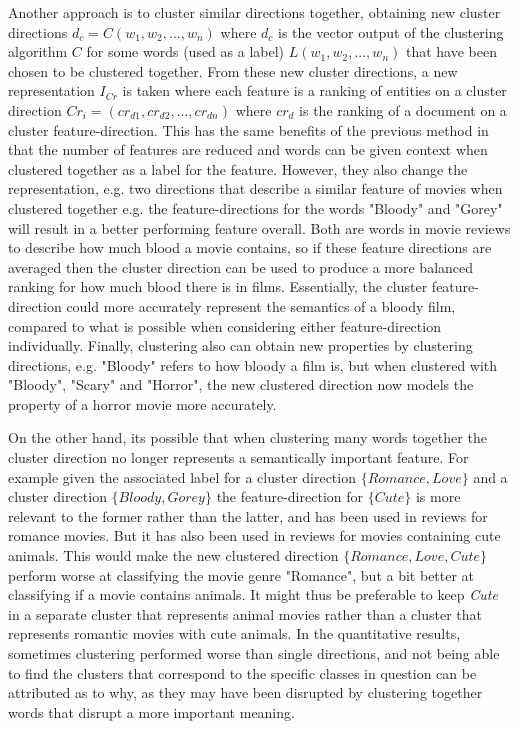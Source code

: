Another approach is to cluster similar directions together, obtaining new cluster directions ${d_c} = C(w_1, w_2, ..., w_n)$  where  $d_c$ is the vector output of the clustering algorithm $C$ for some words (used as a label) $L(w_1, w_2, ..., w_n)$  that have been chosen to be clustered together. From these new cluster directions,  a new representation $I_{Cr}$ is taken where each feature is a  ranking of entities on a cluster direction  ${Cr_i} = ({cr}_{d1}, {cr}_{d2}, ..., {cr}_{dn})$ where ${cr}_d$ is the ranking of a document on a cluster feature-direction.  %
This has the same  benefits of the previous method in that the number of features are reduced and words can be given context when clustered together as a label for the feature. However, they also change the representation, e.g. two directions that describe a similar feature of movies when clustered together  e.g. the feature-directions for the words "Bloody" and "Gorey" will result in a better performing feature overall. Both are words in movie reviews to describe how much blood a movie contains, so if these feature directions are averaged then the cluster direction can be used to produce a more balanced ranking for how much blood there is in films.  Essentially, the cluster feature-direction could more accurately represent the semantics of a bloody  film, compared to what is possible when considering either feature-direction individually. Finally, clustering also can obtain new properties by clustering directions, e.g. "Bloody" refers to how bloody a film is, but when clustered with "Bloody", "Scary" and "Horror", the new clustered direction now models the property of a horror movie more accurately.


On the other hand, its possible that when clustering many words together the cluster direction no longer represents a semantically important feature. For example given the associated label for a cluster direction $\{Romance, Love\}$ and a cluster direction $\{Bloody, Gorey\}$ the feature-direction for $\{Cute\}$ is more relevant to the former rather than the latter, and  has been used in reviews for romance movies. But it has also been used in reviews for movies containing cute animals. This would make the new clustered direction $\{Romance, Love, Cute\}$ perform worse at classifying the movie genre "Romance", but a bit better at classifying if a movie contains animals. It might thus be preferable to keep \textit{Cute} in a separate cluster that represents  animal movies rather than a cluster that represents romantic movies with cute animals. In the quantitative results, sometimes clustering performed worse than single directions, and not being able to find the clusters that correspond to the specific classes in question can be attributed as to why, as they may have been  disrupted by clustering together words that disrupt a more important meaning. 

